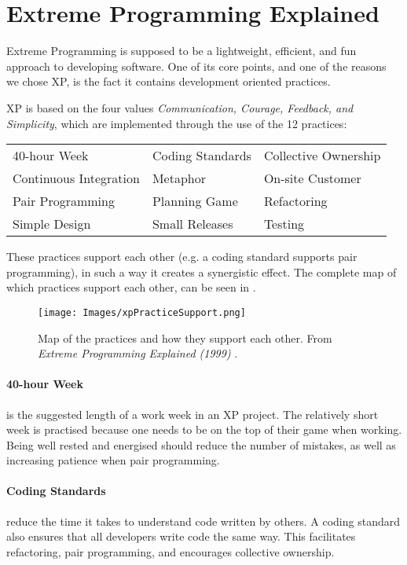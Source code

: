 \section{Extreme Programming Explained}

Extreme Programming is supposed to be a lightweight, efficient, and fun approach to developing software.
One of its core points, and one of the reasons we chose XP, is the fact it contains development oriented practices.

\noindent XP is based on the four values \textit{Communication, Courage, Feedback, and Simplicity}, which are implemented through the use of the 12 practices:

\begin{tabularx}{\textwidth}{X X X}
	40-hour Week				 & Coding Standards & Collective Ownership \\
	Continuous Integration	  & Metaphor         	 & On-site Customer     \\
	Pair Programming			& Planning Game		& Refactoring          \\
	Simple Design          		  & Small Releases   	& Testing             
\end{tabularx}

These practices support each other (e.g. a coding standard supports pair programming), in such a way it creates a synergistic effect.
The complete map of which practices support each other, can be seen in .
\begin{figure}[H]
	\centering
	\texttt{[image: Images/xpPracticeSupport.png]}
		\caption{Map of the practices and how they support each other.
			From \textit{Extreme Programming Explained (1999)} \citep[p. 70]{xp:explained}. }
	\label{fig:practiceSupport}
\end{figure}

\paragraph{40-hour Week} is the suggested length of a work week in an XP project.
The relatively short week is practised because one needs to be on the top of their game when working.
Being well rested and energised should reduce the number of mistakes, as well as increasing patience when pair programming.

\paragraph{Coding Standards} reduce the time it takes to understand code written by others.
A coding standard also ensures that all developers write code the same way.
This facilitates refactoring, pair programming, and encourages collective ownership.

